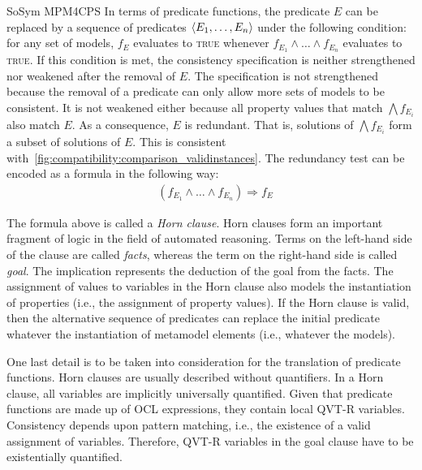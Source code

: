 \begin{copiedFrom}{SoSym MPM4CPS}
In terms of predicate functions, the predicate $E$ can be replaced by a sequence of predicates $\langle E_1, \dots, E_n \rangle$ under the following condition: for any set of models, $f_E$ evaluates to \textsc{true} whenever $f_{E_1} \wedge \dots \wedge f_{E_n}$ evaluates to \textsc{true}. If this condition is met, the consistency specification is neither strengthened nor weakened after the removal of $E$. The specification is not strengthened because the removal of a predicate can only allow more sets of models to be consistent. It is not weakened either because all property values that match $\bigwedge f_{E_i}$ also match $E$. As a consequence, $E$ is redundant. That is, solutions of $\bigwedge f_{E_i}$ form a subset of solutions of $E$. This is consistent with~\autoref{fig:compatibility:comparison_validinstances}. The redundancy test can be encoded as a formula in the following way:
\begin{align*}
    &
    (f_{E_1} \wedge \dots \wedge f_{E_n}) \Rightarrow f_{E}
\end{align*}

The formula above is called a \textit{Horn clause}. Horn clauses form an important fragment of logic in the field of automated reasoning. Terms on the left-hand side of the clause are called \textit{facts}, whereas the term on the right-hand side is called \textit{goal}. The implication represents the deduction of the goal from the facts. The assignment of values to variables in the Horn clause also models the instantiation of properties (i.e., the assignment of property values). If the Horn clause is valid, then the alternative sequence of predicates can replace the initial predicate whatever the instantiation of metamodel elements (i.e., whatever the models).

One last detail is to be taken into consideration for the translation of predicate functions. Horn clauses are usually described without quantifiers. In a Horn clause, all variables are implicitly universally quantified. Given that predicate functions are made up of OCL expressions, they contain local QVT-R variables. Consistency depends upon pattern matching, i.e., the existence of a valid assignment of variables. Therefore, QVT-R variables in the goal clause have to be existentially quantified.


\end{copiedFrom}
